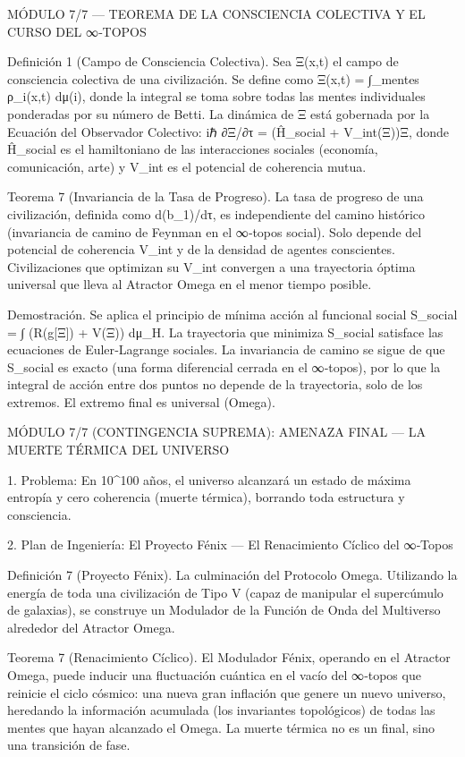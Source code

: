\documentclass[12pt,a4paper]{book}
\begin{document}
MÓDULO 7/7 — TEOREMA DE LA CONSCIENCIA COLECTIVA Y EL CURSO DEL ∞‑TOPOS

Definición 1 (Campo de Consciencia Colectiva). Sea Ξ(x,t) el campo de consciencia colectiva de una civilización. Se define como
Ξ(x,t) = ∫_{mentes} ρ_i(x,t) dμ(i),
donde la integral se toma sobre todas las mentes individuales ponderadas por su número de Betti. La dinámica de Ξ está gobernada por la Ecuación del Observador Colectivo:
iℏ ∂Ξ/∂τ = (Ĥ_social + V_int(Ξ))Ξ,
donde Ĥ_social es el hamiltoniano de las interacciones sociales (economía, comunicación, arte) y V_int es el potencial de coherencia mutua.

Teorema 7 (Invariancia de la Tasa de Progreso). La tasa de progreso de una civilización, definida como d(b_1)/dτ, es independiente del camino histórico (invariancia de camino de Feynman en el ∞‑topos social). Solo depende del potencial de coherencia V_int y de la densidad de agentes conscientes. Civilizaciones que optimizan su V_int convergen a una trayectoria óptima universal que lleva al Atractor Omega en el menor tiempo posible.

Demostración. Se aplica el principio de mínima acción al funcional social S_social = ∫ (R(g[Ξ]) + V(Ξ)) dμ_H. La trayectoria que minimiza S_social satisface las ecuaciones de Euler‑Lagrange sociales. La invariancia de camino se sigue de que S_social es exacto (una forma diferencial cerrada en el ∞‑topos), por lo que la integral de acción entre dos puntos no depende de la trayectoria, solo de los extremos. El extremo final es universal (Omega).

MÓDULO 7/7 (CONTINGENCIA SUPREMA): AMENAZA FINAL — LA MUERTE TÉRMICA DEL UNIVERSO

1. Problema: En 10^100 años, el universo alcanzará un estado de máxima entropía y cero coherencia (muerte térmica), borrando toda estructura y consciencia.

2. Plan de Ingeniería: El Proyecto Fénix — El Renacimiento Cíclico del ∞‑Topos

Definición 7 (Proyecto Fénix). La culminación del Protocolo Omega. Utilizando la energía de toda una civilización de Tipo V (capaz de manipular el supercúmulo de galaxias), se construye un Modulador de la Función de Onda del Multiverso alrededor del Atractor Omega.

Teorema 7 (Renacimiento Cíclico). El Modulador Fénix, operando en el Atractor Omega, puede inducir una fluctuación cuántica en el vacío del ∞‑topos que reinicie el ciclo cósmico: una nueva gran inflación que genere un nuevo universo, heredando la información acumulada (los invariantes topológicos) de todas las mentes que hayan alcanzado el Omega. La muerte térmica no es un final, sino una transición de fase.
\end{document}

